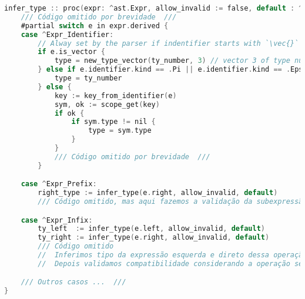 \begin{codigo}[htb]
    \caption{\small Parte do switch da inferencia de tipos. }
    \label{cod-type-inference}
\begin{lstlisting}[language=C, basicstyle=\ttfamily\footnotesize,frame=none, inputencoding=utf8]
infer_type :: proc(expr: ^ast.Expr, allow_invalid := false, default : ^ast.Type = ast.ty_invalid ) -> ^Type {
    /// Código omitido por brevidade  ///
    #partial switch e in expr.derived {
    case ^Expr_Identifier:
        // Alway set by the parser if indentifier starts with `\vec{}`
        if e.is_vector {
            type = new_type_vector(ty_number, 3) // vector 3 of type number (real)
        } else if e.identifier.kind == .Pi || e.identifier.kind == .Epsilon {
            type = ty_number
        } else {
            key := key_from_identifier(e)
            sym, ok := scope_get(key)
            if ok {
                if sym.type != nil {
                    type = sym.type
                }
            }
            /// Código omitido por brevidade  ///
        }

    case ^Expr_Prefix:
        right_type := infer_type(e.right, allow_invalid, default)
        /// Código omitido, mas aqui fazemos a validação da subexpressão direita e atribuimos o tipo correto para Expr_Prefix   ///

    case ^Expr_Infix:
        ty_left  := infer_type(e.left, allow_invalid, default)
        ty_right := infer_type(e.right, allow_invalid, default)
        /// Código omitido
        //  Inferimos tipo da expressão esquerda e direto dessa operação binária
        //  Depois validamos compatibilidade considerando a operação sendo usada nessas duas expressões

    /// Outros casos ...  ///
}
\end{lstlisting}
\end{codigo}
